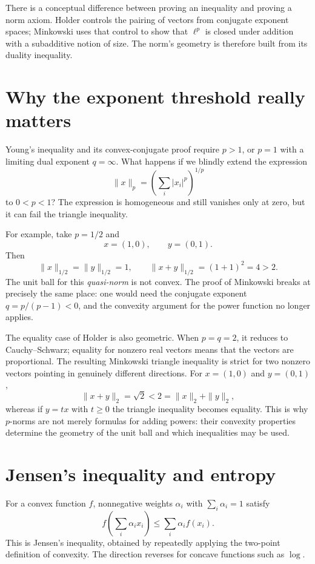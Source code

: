 There is a conceptual difference between proving an inequality and proving a norm axiom. Holder controls the pairing of vectors from conjugate exponent spaces; Minkowski uses that control to show that \(\ell^p\) is closed under addition with a subadditive notion of size. The norm's geometry is therefore built from its duality inequality.

\section{Why the exponent threshold really matters}

Young's inequality and its convex-conjugate proof require $p>1$, or $p=1$ with a limiting dual exponent $q=\infty$. What happens if we blindly extend the expression
\[
 \|x\|_p=\left(\sum_i|x_i|^p\right)^{1/p}
\]
to $0<p<1$? The expression is homogeneous and still vanishes only at zero, but it can fail the triangle inequality.

For example, take $p=1/2$ and
\[
 x=(1,0),\qquad y=(0,1).
\]
Then
\[
 \|x\|_{1/2}=\|y\|_{1/2}=1,\qquad
 \boxed{\|x+y\|_{1/2}=(1+1)^2=4>2.}
\]
The unit ball for this \emph{quasi-norm} is not convex. The proof of Minkowski breaks at precisely the same place: one would need the conjugate exponent $q=p/(p-1)<0$, and the convexity argument for the power function no longer applies.

The equality case of Holder is also geometric. When $p=q=2$, it reduces to Cauchy--Schwarz; equality for nonzero real vectors means that the vectors are proportional. The resulting Minkowski triangle inequality is strict for two nonzero vectors pointing in genuinely different directions. For $x=(1,0)$ and $y=(0,1)$,
\[
 \|x+y\|_2=\sqrt2<2=\|x\|_2+\|y\|_2,
\]
whereas if $y=tx$ with $t\ge0$ the triangle inequality becomes equality. This is why $p$-norms are not merely formulas for adding powers: their convexity properties determine the geometry of the unit ball and which inequalities may be used.

\section{Jensen's inequality and entropy}

For a convex function \(f\), nonnegative weights \(\alpha_i\) with \(\sum_i\alpha_i=1\) satisfy
\[
 f\left(\sum_i\alpha_i x_i\right)\le\sum_i\alpha_i f(x_i).
\]
This is Jensen's inequality, obtained by repeatedly applying the two-point definition of convexity. The direction reverses for concave functions such as \(\log\).

